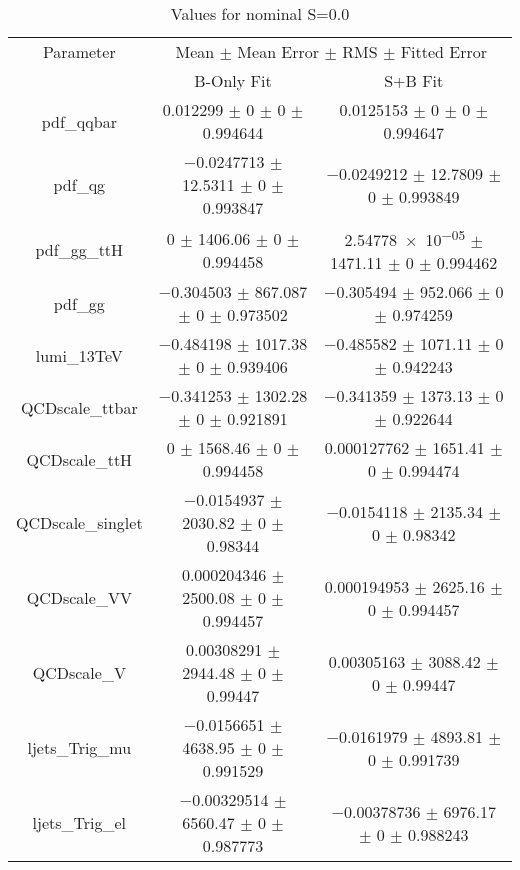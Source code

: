 \begin{table}
\centering
\caption{Values for nominal S=0.0}
\begin{tabular}{ccc}
\toprule
Parameter & \multicolumn{2}{c}{Mean $\pm$ Mean Error $\pm$ RMS $\pm$ Fitted Error}\\
 & B-Only Fit & S+B Fit\\
\midrule
pdf\_qqbar & \num{0.012299} $\pm$ \num{0} $\pm$ \num{0} $\pm$ \num{0.994644} & \num{0.0125153} $\pm$ \num{0} $\pm$ \num{0} $\pm$ \num{0.994647}\\
pdf\_qg & \num{-0.0247713} $\pm$ \num{12.5311} $\pm$ \num{0} $\pm$ \num{0.993847} & \num{-0.0249212} $\pm$ \num{12.7809} $\pm$ \num{0} $\pm$ \num{0.993849}\\
pdf\_gg\_ttH & \num{0} $\pm$ \num{1406.06} $\pm$ \num{0} $\pm$ \num{0.994458} & \num{2.54778e-05} $\pm$ \num{1471.11} $\pm$ \num{0} $\pm$ \num{0.994462}\\
pdf\_gg & \num{-0.304503} $\pm$ \num{867.087} $\pm$ \num{0} $\pm$ \num{0.973502} & \num{-0.305494} $\pm$ \num{952.066} $\pm$ \num{0} $\pm$ \num{0.974259}\\
lumi\_13TeV & \num{-0.484198} $\pm$ \num{1017.38} $\pm$ \num{0} $\pm$ \num{0.939406} & \num{-0.485582} $\pm$ \num{1071.11} $\pm$ \num{0} $\pm$ \num{0.942243}\\
QCDscale\_ttbar & \num{-0.341253} $\pm$ \num{1302.28} $\pm$ \num{0} $\pm$ \num{0.921891} & \num{-0.341359} $\pm$ \num{1373.13} $\pm$ \num{0} $\pm$ \num{0.922644}\\
QCDscale\_ttH & \num{0} $\pm$ \num{1568.46} $\pm$ \num{0} $\pm$ \num{0.994458} & \num{0.000127762} $\pm$ \num{1651.41} $\pm$ \num{0} $\pm$ \num{0.994474}\\
QCDscale\_singlet & \num{-0.0154937} $\pm$ \num{2030.82} $\pm$ \num{0} $\pm$ \num{0.98344} & \num{-0.0154118} $\pm$ \num{2135.34} $\pm$ \num{0} $\pm$ \num{0.98342}\\
QCDscale\_VV & \num{0.000204346} $\pm$ \num{2500.08} $\pm$ \num{0} $\pm$ \num{0.994457} & \num{0.000194953} $\pm$ \num{2625.16} $\pm$ \num{0} $\pm$ \num{0.994457}\\
QCDscale\_V & \num{0.00308291} $\pm$ \num{2944.48} $\pm$ \num{0} $\pm$ \num{0.99447} & \num{0.00305163} $\pm$ \num{3088.42} $\pm$ \num{0} $\pm$ \num{0.99447}\\
ljets\_Trig\_mu & \num{-0.0156651} $\pm$ \num{4638.95} $\pm$ \num{0} $\pm$ \num{0.991529} & \num{-0.0161979} $\pm$ \num{4893.81} $\pm$ \num{0} $\pm$ \num{0.991739}\\
ljets\_Trig\_el & \num{-0.00329514} $\pm$ \num{6560.47} $\pm$ \num{0} $\pm$ \num{0.987773} & \num{-0.00378736} $\pm$ \num{6976.17} $\pm$ \num{0} $\pm$ \num{0.988243}\\

\end{tabular}
\end{table}
